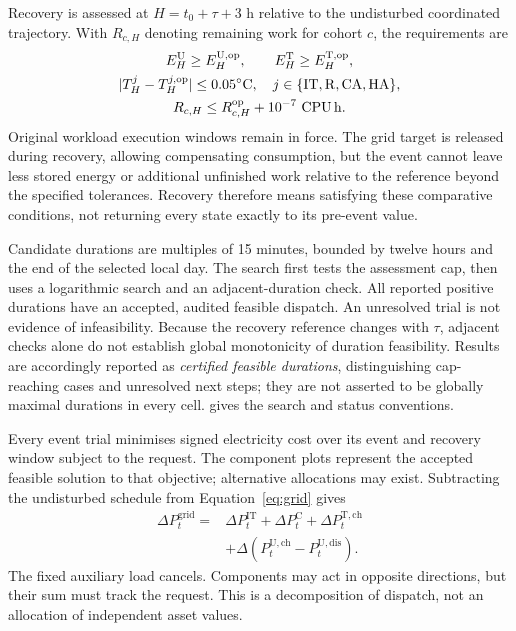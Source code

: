 Recovery is assessed at $H=t_0+\tau+3$ h relative to the undisturbed coordinated trajectory. With $R_{c,H}$ denoting remaining work for cohort $c$, the requirements are
\begin{equation}
\begin{gathered}
E_H^{\mathrm{U}}\geq E_H^{\mathrm{U},\mathrm{op}},\qquad
E_H^{\mathrm{T}}\geq E_H^{\mathrm{T},\mathrm{op}},\\
|T_H^j-T_H^{j,\mathrm{op}}|\leq0.05^{\circ}\mathrm C,
\quad j\in\{\mathrm{IT,R,CA,HA}\},\\
R_{c,H}\leq R_{c,H}^{\mathrm{op}}+10^{-7}\ \mathrm{CPU\,h}.
\end{gathered}
\label{eq:recovery}
\end{equation}
Original workload execution windows remain in force. The grid target is released during recovery, allowing compensating consumption, but the event cannot leave less stored energy or additional unfinished work relative to the reference beyond the specified tolerances. Recovery therefore means satisfying these comparative conditions, not returning every state exactly to its pre-event value.

Candidate durations are multiples of 15 minutes, bounded by twelve hours and the end of the selected local day. The search first tests the assessment cap, then uses a logarithmic search and an adjacent-duration check. All reported positive durations have an accepted, audited feasible dispatch. An unresolved trial is not evidence of infeasibility. Because the recovery reference changes with $\tau$, adjacent checks alone do not establish global monotonicity of duration feasibility. Results are accordingly reported as \emph{certified feasible durations}, distinguishing cap-reaching cases and unresolved next steps; they are not asserted to be globally maximal durations in every cell.  gives the search and status conventions.

Every event trial minimises signed electricity cost over its event and recovery window subject to the request. The component plots represent the accepted feasible solution to that objective; alternative allocations may exist. Subtracting the undisturbed schedule from Equation~\eqref{eq:grid} gives
\begin{equation}
\begin{split}
\Delta P_t^{\mathrm{grid}}={}&\Delta P_t^{\mathrm{IT}}+
\Delta P_t^{\mathrm{C}}+\Delta P_t^{\mathrm{T,ch}}\\
&+\Delta(P_t^{\mathrm{U,ch}}-P_t^{\mathrm{U,dis}}).
\end{split}
\label{eq:decomposition}
\end{equation}
The fixed auxiliary load cancels. Components may act in opposite directions, but their sum must track the request. This is a decomposition of dispatch, not an allocation of independent asset values.

